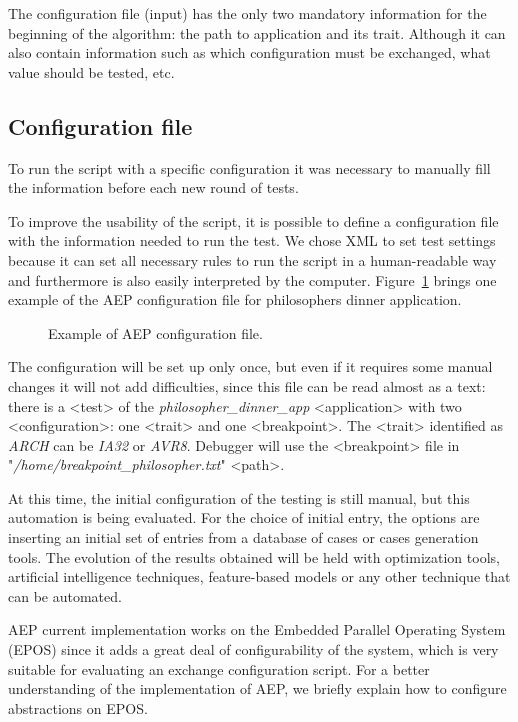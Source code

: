 \documentclass[conference]{IEEEtran}
\newcommand{\progxml}[3][tbp]{
 \begin{figure}[#1]
     
   \caption{#3\label{progxml:#2}}
 \end{figure}
}
\begin{document}
The configuration file (input) has the only two mandatory information for the beginning of the algorithm: the path to application and its trait. Although it can also contain information such as which configuration must be exchanged, what value should be tested, etc.

\subsection{Configuration file}
\label{sec:configuration_file}
To run the script with a specific configuration it was necessary to manually fill the information before each new round of tests. 

To improve the usability of the script, it is possible to define a configuration file with the information needed to run the test. We chose XML to set test settings because it can set all necessary rules to run the script in a human-readable way and furthermore is also easily interpreted by the computer. Figure~\ref{progxml:philosopher_xml} brings one example of the AEP configuration file for philosophers dinner application.

\progxml{philosopher_xml}{Example of AEP configuration file.}

The configuration will be set up only once, but even if it requires some manual changes it will not add difficulties, since this file can be read almost as a text: there is a <test> of the \textit{philosopher\_dinner\_app} <application> with two <configuration>: one <trait> and one <breakpoint>. The <trait> identified as \textit{ARCH} can be \textit{IA32} or \textit{AVR8}. Debugger will use the <breakpoint> file in "\textit{/home/breakpoint\_philosopher.txt}" <path>.

At this time,  the initial configuration of the testing is still manual, but  this automation is being evaluated. For the choice of initial entry, the options are inserting an initial set of entries from a database of cases or cases generation tools. The evolution of the results obtained will be held with optimization tools, artificial intelligence techniques, feature-based models or any other technique that can be automated.

AEP current implementation works on the Embedded Parallel Operating System (EPOS) \cite{Froehlich:2001} since it adds a great deal of configurability of the system, which is very suitable for evaluating an exchange configuration script. For a better understanding of the implementation of AEP, we briefly explain how to configure abstractions on EPOS.
\end{document}
